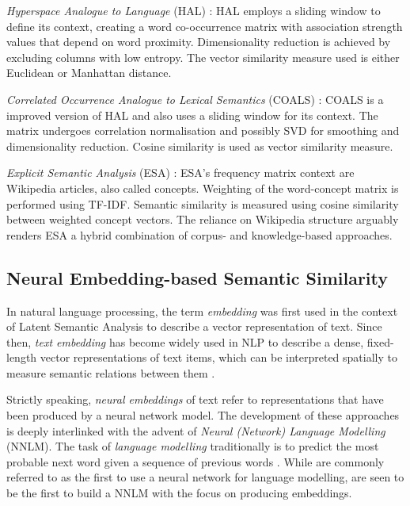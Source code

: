 \documentclass[11pt]{scrreprt}
\let\citef\cite  %
\let\cite\parencite  %
\begin{document}
\textit{Hyperspace Analogue to Language} (HAL) \cite{lundProducingHighdimensionalSemantic1996}: HAL employs a sliding window to define its context, creating a word co-occurrence matrix with association strength values that depend on word proximity. Dimensionality reduction is achieved by excluding columns with low entropy. The vector similarity measure used is either Euclidean or Manhattan distance.

\textit{Correlated Occurrence Analogue to Lexical Semantics} (COALS) \cite{rohde2006improved}: COALS is a improved version of HAL and also uses a sliding window for its context. The matrix undergoes correlation normalisation and possibly SVD for smoothing and dimensionality reduction. Cosine similarity is used as vector similarity measure.

\textit{Explicit Semantic Analysis} (ESA) \cite{gabrilovich2007computing}: ESA's frequency matrix context are Wikipedia articles, also called concepts. Weighting of the word-concept matrix is performed using TF-IDF. Semantic similarity is measured using cosine similarity between weighted concept vectors. The reliance on Wikipedia structure arguably renders ESA a hybrid combination of corpus- and knowledge-based approaches.


\subsection{Neural Embedding-based Semantic Similarity}
\label{sec:neural-embedding-semantic-similarity}
In natural language processing, the term \textit{embedding} was first used in the context of Latent Semantic Analysis \cite{deerwesterIndexingLatentSemantic1990} to describe a vector representation of text. Since then, \textit{text embedding} has become widely used in NLP to describe a dense, fixed-length vector representations of text items, which can be interpreted spatially to measure semantic relations between them \cite{almeidaWordEmbeddingsSurvey2023}.

Strictly speaking, \textit{neural embeddings} of text refer to representations that have been produced by a neural network model. The development of these approaches is deeply interlinked with the advent of \textit{Neural (Network) Language Modelling} (NNLM). The task of \textit{language modelling} traditionally is to predict the most probable next word given a sequence of previous words \cite{chenEmpiricalStudySmoothing1999}. While \citef{bengioNeuralProbabilisticLanguage2000} are commonly referred to as the first to use a neural network for language modelling, \citef{collobertUnifiedArchitectureNatural2008} are seen to be the first to build a NNLM with the focus on producing embeddings.
\end{document}
